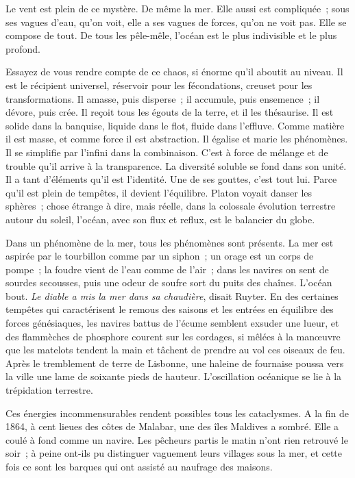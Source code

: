 \documentclass[french,twoside]{book} %
\begin{document}
 Le vent est plein de ce mystère. De même la mer. Elle aussi est compliquée ; sous ses vagues d’eau, qu’on voit, elle a ses vagues de forces, qu’on ne voit pas. Elle se compose de tout. De tous les pêle-mêle, l’océan est le plus indivisible et le plus profond.\par
Essayez de vous rendre compte de ce chaos, si énorme qu’il aboutit au niveau. Il est le récipient universel, réservoir pour les fécondations, creuset pour les transformations. Il amasse, puis disperse ; il accumule, puis ensemence ; il dévore, puis crée. Il reçoit tous les égouts de la terre, et il les thésaurise. Il est solide dans la banquise, liquide dans le flot, fluide dans l’effluve. Comme matière il est masse, et comme force il est abstraction. Il égalise et marie les phénomènes. Il se simplifie par l’infini dans la combinaison. C’est à force de mélange et de trouble qu’il arrive à la transparence. La diversité soluble se fond dans son unité. Il a tant d’éléments qu’il est l’identité. Une de ses gouttes, c’est tout lui. Parce qu’il est plein de tempêtes, il devient l’équilibre. Platon voyait danser les sphères ; chose étrange à dire, mais réelle, dans la colossale évolution terrestre autour du soleil, l’océan, avec son flux et reflux, est le balancier du globe.\par
Dans un phénomène de la mer, tous les phénomènes sont présents. La mer est aspirée par le tourbillon comme par un siphon ; un orage est un corps de pompe ; la foudre vient de l’eau comme de l’air ; dans les navires on sent de sourdes secousses, puis une odeur de soufre sort du puits des chaînes. L’océan bout. \emph{Le diable a mis la mer dans sa chaudière}, disait  Ruyter. En des certaines tempêtes qui caractérisent le remous des saisons et les entrées en équilibre des forces génésiaques, les navires battus de l’écume semblent exsuder une lueur, et des flammèches de phosphore courent sur les cordages, si mêlées à la manœuvre que les matelots tendent la main et tâchent de prendre au vol ces oiseaux de feu. Après le tremblement de terre de Lisbonne, une haleine de fournaise poussa vers la ville une lame de soixante pieds de hauteur. L’oscillation océanique se lie à la trépidation terrestre.\par
Ces énergies incommensurables rendent possibles tous les cataclysmes. A la fin de 1864, à cent lieues des côtes de Malabar, une des îles Maldives a sombré. Elle a coulé à fond comme un navire. Les pêcheurs partis le matin n’ont rien retrouvé le soir ; à peine ont-ils pu distinguer vaguement leurs villages sous la mer, et cette fois ce sont les barques qui ont assisté au naufrage des maisons.\par
\end{document}
